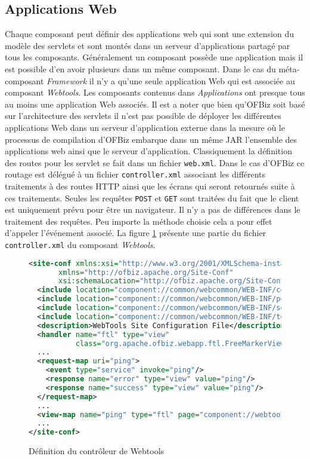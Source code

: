 \documentclass[a4paper, 11pt]{report}
\begin{document}
\subsection{Applications Web}

Chaque composant peut définir des applications web qui sont une
extension du modèle des servlets et sont montés dans un serveur
d'applications partagé par tous les composants. Généralement un
composant possède une application mais il est possible d'en avoir
plusieurs dans un même composant. Dans le cas du méta-composant
\emph{Framework} il n'y a qu'une seule application Web qui est associée
au composant \emph{Webtools}. Les composants contenus dans
\emph{Applications} ont presque tous au moins une application Web
associés. Il est a noter que bien qu'OFBiz soit basé sur l'architecture
des servlets il n'est pas possible de déployer les différentes
applications Web dans un serveur d'application externe dans la mesure
où le processus de compilation d'OFBiz embarque dans un même JAR
l'ensemble des applications web ainsi que le serveur d'application.
Classiquement la définition des routes pour les servlet se fait dans
un fichier \verb=web.xml=. Dans le cas d'OFBiz ce routage est délégué
à un fichier \verb=controller.xml= associant les différents
traitements à des routes HTTP ainsi que les écrans qui seront
retournés suite à ces traitements. Seules les requêtes \verb=POST= et
\verb=GET= sont traitées du fait que le client est uniquement prévu
pour être un navigateur. Il n'y a pas de différences dans le traitement
des requêtes. Peu importe la méthode choisie cela a pour effet
d'appeler l'événement associé. La figure \ref{fig:controller}
présente une partie du fichier \verb=controller.xml= du composant
\emph{Webtools}.

\begin{figure}
  \begin{lstlisting}[language=xml]
<site-conf xmlns:xsi="http://www.w3.org/2001/XMLSchema-instance"
	   xmlns="http://ofbiz.apache.org/Site-Conf"
	   xsi:schemaLocation="http://ofbiz.apache.org/Site-Conf...">
  <include location="component://common/webcommon/WEB-INF/common-controller.xml"/>
  <include location="component://common/webcommon/WEB-INF/portal-controller.xml"/>
  <include location="component://common/webcommon/WEB-INF/security-controller.xml"/>
  <include location="component://common/webcommon/WEB-INF/tempexpr-controller.xml"/>
  <description>WebTools Site Configuration File</description>
  <handler name="ftl" type="view"
           class="org.apache.ofbiz.webapp.ftl.FreeMarkerViewHandler"/>
  ...
  <request-map uri="ping">
    <event type="service" invoke="ping"/>
    <response name="error" type="view" value="ping"/>
    <response name="success" type="view" value="ping"/>
  </request-map>
  ...
  <view-map name="ping" type="ftl" page="component://webtools/template/Ping.ftl"/>
  ...
</site-conf>
  \end{lstlisting}
  \caption{Définition du contrôleur de Webtools}
  \label{fig:controller}
\end{figure}
\end{document}
